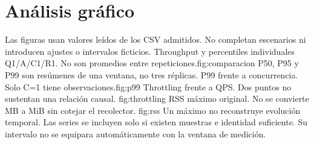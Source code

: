 \section{Análisis gráfico}
Las figuras usan valores leídos de los CSV admitidos. No completan
escenarios ni introducen ajustes o intervalos ficticios.
{Throughput y percentiles individuales Q1/A/C1/R1. No son promedios
entre repeticiones.}{fig:comparacion}
P50, P95 y P99 son resúmenes de una ventana, no tres réplicas.
{P99 frente a concurrencia. Solo C=1 tiene observaciones.}{fig:p99}
{Throttling frente a QPS. Dos puntos no sustentan una relación causal.}
{fig:throttling}
{RSS máximo original. No se convierte MB a MiB sin cotejar el recolector.}
{fig:rss}
Un máximo no reconstruye evolución temporal. Las series se incluyen solo
si existen muestras e identidad suficiente. Su intervalo no se equipara
automáticamente con la ventana de medición.

